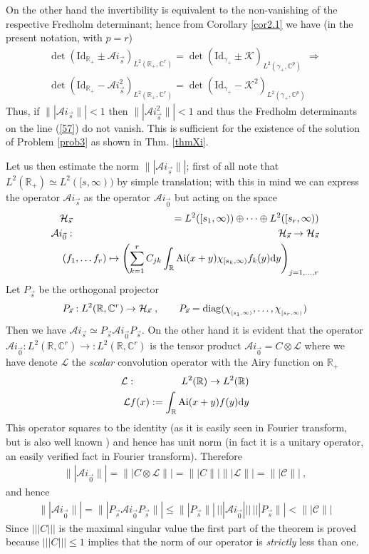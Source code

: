 \documentclass{article}
\def\H{\mathcal H}
\def \C{{\mathbf C}}
\def\C{{\mathbb C}}
\def\&{&\hspace{-20pt}}
\def\R{{\mathbb R}}
\def\d{{\rm d}}
\def\Id{\mathrm{Id}}
\def\Ai{\mathrm{Ai}}
\def\Ai{\mathrm{Ai}}
\newcommand{\be}{\begin{eqnarray}}
\newcommand{\ee}{\end{eqnarray}}
\def\le{\left}
\def\ri{\right}
\begin{document}
On the other hand the invertibility is equivalent to the non-vanishing of the respective Fredholm determinant; hence from Corollary \ref{cor2.1} we have  (in the present notation, with $p=r$)
\be
\det \le(\Id_{\R_+} \pm\mathcal Ai_{\vec s} \ri)_{L^2(\R_+,\C^r)}   = \det \le(\Id_{\gamma_+} \pm \mathcal K\ri)_{  L^2(\gamma_+,\C^p)} \ \ \Rightarrow\\
\det \le(\Id_{\R_+} - \mathcal Ai_{\vec s}^2  \ri)_{L^2(\R_+,\C^r)}   =\det \le(\Id_{\gamma_+} - \mathcal K^2\ri)_{  L^2(\gamma_+,\C^p)}
\label{57}
\ee
Thus, if $\|| \mathcal Ai_{\vec s}\||<1$ then  $\|| \mathcal Ai_{\vec s}^2\||<1$  and thus the Fredholm determinants on the line (\ref{57}) do not vanish. This is sufficient for the existence of the solution of Problem \ref{prob3} as shown in Thm. \ref{thmXi}. 

Let us then estimate the  norm $\|| \mathcal Ai_{\vec s}\||$; 
first of all note that $L^2(\R_+) \simeq L^2([s,\infty))$ by simple translation; with this in mind we can express the operator $\mathcal Ai_{\vec s}$ as the operator $\mathcal Ai_{\vec 0}$ but acting on the space 
\be
\mathcal H_{\vec s} &\&= L^2([s_1,\infty)) \oplus\dots \oplus L^2([s_r,\infty))\\
\mathcal Ai_{\vec 0}: &\&\mathcal H_{\vec s}  \to \mathcal H_{\vec s} \\
&\&(f_1,\dots f_r) \mapsto \le(\sum_{k=1}^r C_{jk} \int_{\R} \Ai(x+y) \chi_{[s_k,\infty)} f_k(y)\d y\ri)_{j=1,\dots, r}
\ee
Let $P_{\vec s}$ be the orthogonal projector 
\be
P_{\vec s}:L^2(\R,\C^r) \to \H_{\vec s}\ ,\qquad P_{\vec s} = {\rm diag} (\chi_{_{[s_1,\infty)}}, \dots , \chi_{_{[s_r,\infty)}})
\ee
Then we have 
$\mathcal Ai_{\vec s} \simeq P_{\vec s} \mathcal Ai_{\vec 0} P_{\vec s}$. On the other hand it is evident that 
the operator $
\mathcal Ai_{\vec 0} :L^2(\R,\C^r) \to :L^2(\R,\C^r)
$ is the tensor product $ \mathcal Ai_{\vec 0} = C\otimes \mathcal L$
where we have denote $\mathcal L$ the {\em scalar} convolution operator with the Airy function on $\R_+$
\be
\mathcal L:&\&L^2(\R)\to L^2(\R)\\
&\& \mathcal L f(x):= \int_{\R} \Ai(x+y) f(y)\d y
\ee 
This operator squares to the identity (as it is easily seen in Fourier transform, but is also well  known \cite{TracyWidomLevel}) and hence has unit norm (in fact it is a unitary operator, an easily verified fact in Fourier transform).
Therefore 
\be
\|| \mathcal Ai_{\vec 0} \|| = \|| C\otimes \mathcal L\|| = \||C\||  \||\mathcal L\|| = \||\mathcal C\||\ ,
\ee
and hence 
\be
\|| \mathcal Ai_{\vec 0} \||   =\|| P_{\vec s} \mathcal Ai_{\vec 0}P_{\vec s}  \||\leq \|| P_{\vec s} \||\,||| \mathcal Ai_{\vec 0}|||\,|||P_{\vec s}  \|| <   \||\mathcal C\||
\ee
Since $|||C|||$ is the maximal singular value the first part of the theorem is proved because $|||C|||\leq 1$ implies that the norm of our operator is {\em strictly} less than one.
\end{document}
